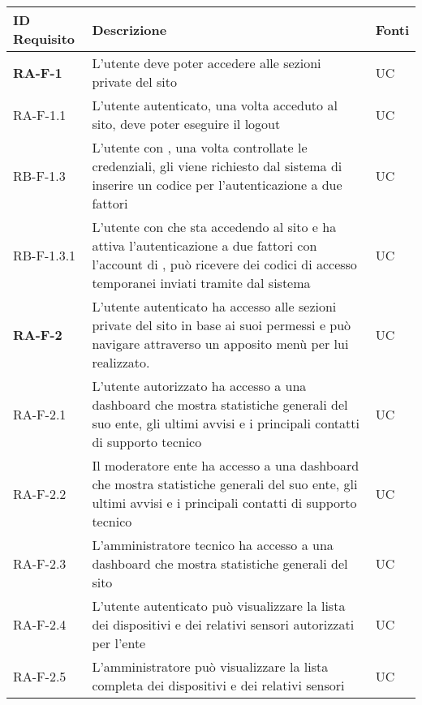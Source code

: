 	\begin{center}
		\begin{longtable}{|p{3cm}|p{9.85cm}|p{2cm}|}
		\hline
		\rowcolor{red_requisiti}
		{\color{white} \textbf{ID Requisito} } & {\color{white} \textbf{Descrizione} } & {\color{white} \textbf{Fonti} } \\ 
		\hline
		\endhead

		\textbf{RA-F-1} & L'utente deve poter accedere alle sezioni private del sito & UC \\ \hline
		{\color{gray} RA-F-}1.1 & L'utente autenticato, una volta acceduto al sito, deve poter eseguire il logout & UC \\ \hline
		{\color{gray} RB-F-}1.3 & L'utente con \glock{account valido}, una volta controllate le credenziali, gli viene richiesto dal sistema di inserire un codice per l'autenticazione a due fattori & UC \\ \hline
		{\color{gray} RB-F-}1.3.1 & L'utente con \glock{account valido} che sta accedendo al sito e ha attiva l'autenticazione a due fattori con l'account di \glock{Telegram}, può ricevere dei codici di accesso temporanei inviati tramite \glock{Telegram} dal sistema & UC \\ \hline
		
		\textbf{RA-F-2} & L'utente autenticato ha accesso alle sezioni private del sito in base ai suoi permessi e può navigare attraverso un apposito menù per lui realizzato. & UC \\ \hline 
		{\color{gray} RA-F-}2.1 & L'utente autorizzato ha accesso a una dashboard che mostra statistiche generali del suo ente, gli ultimi avvisi e i principali contatti di supporto tecnico & UC \\ \hline
		{\color{gray} RA-F-}2.2 & Il moderatore ente ha accesso a una dashboard che mostra statistiche generali del suo ente, gli ultimi avvisi e i principali contatti di supporto tecnico & UC \\ \hline
		{\color{gray} RA-F-}2.3 & L'amministratore tecnico ha accesso a una dashboard che mostra statistiche generali del sito & UC \\ \hline
		
		{\color{gray} RA-F-}2.4 & L'utente autenticato può visualizzare la lista dei dispositivi e dei relativi sensori autorizzati per l'ente & UC \\ \hline
		{\color{gray} RA-F-}2.5 & L'amministratore può visualizzare la lista completa dei dispositivi e dei relativi sensori & UC \\ \hline


\end{longtable}
\end{center}
